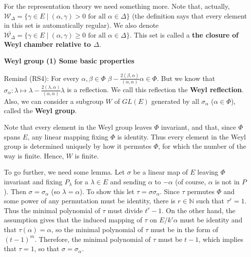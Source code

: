 \documentclass{article}
\newcommand{\NaN}{\mathbb{N}}
\newcommand{\SBar}{\;|\;}
\begin{document}
For the representation theory we need something more.
Note that, actually, $\mathcal{W}_\Delta = \{\gamma \in E \SBar (\alpha, \gamma) > 0 \textrm{ for all $\alpha \in \Delta$}\}$ (the definition says that every element in this set is automatically regular).
We also denote $\overline{\mathcal{W}_\Delta} = \{\gamma \in E \SBar (\alpha, \gamma) \ge 0 \textrm{ for all $\alpha \in \Delta$}\}$.
This set is called a \textbf{the closure of Weyl chamber relative to $\Delta$}.

\newpage

\textbf{Weyl group (1) Some basic properties}

Remind (RS4): For every $\alpha, \beta \in \Phi$ $\beta - \frac{2(\beta, \alpha)}{(\alpha, \alpha)} \alpha \in \Phi$.
But we know that $\sigma_\alpha : \lambda \mapsto \lambda - \frac{2(\lambda, \alpha)}{(\alpha, \alpha)} \lambda$ is a reflection.
We call this reflection the \textbf{Weyl reflection}.
Also, we can consider a subgroup $W$ of $GL(E)$ generated by all $\sigma_\alpha$ ($\alpha \in \Phi$), called the \textbf{Weyl group}.

Note that every element in the Weyl group leaves $\Phi$ invariant, and that, since $\Phi$ spans $E$, any linear mapping fixing $\Phi$ is identity.
Thus every element in the Weyl group is determined uniquely by how it permutes $\Phi$, for which the number of the way is finite.
Hence, $W$ is finite.

To go further, we need some lemma.
Let $\sigma$ be a linear map of $E$ leaving $\Phi$ invariant and fixing $P_\lambda$ for a $\lambda \in E$ and sending $\alpha$ to $-\alpha$ (of course, $\alpha$ is not in $P$).
Then $\sigma = \sigma_\alpha$ (so $\lambda = \alpha$).
To show this let $\tau = \sigma \sigma_\alpha$.
Since $\tau$ permutes $\Phi$ and some power of any permutation must be identity, there is $r \in \NaN$ such that $\tau^r = 1$.
Thus the minimal polynomial of $\tau$ must divide $t^r - 1$.
On the other hand, the assumption gives that the induced mapping of $\tau$ on $E/k'\alpha$ must be identity and that $\tau(\alpha) = \alpha$, so the minimal polynomial of $\tau$ must be in the form of $(t - 1)^m$.
Therefore, the minimal polynomial of $\tau$ must be $t - 1$, which implies that $\tau = 1$, so that $\sigma = \sigma_\alpha$.
\end{document}
